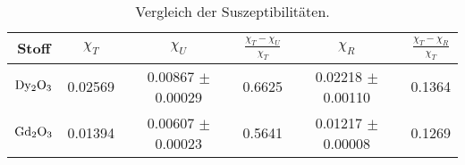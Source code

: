 \begin{table}
  \centering
  \label{tab:vergleich}
  \begin{tabular}{c c c c c c}
    \toprule
    {Stoff} & {$\chi_T$} &{$\chi_U$} & {$\frac{\chi_T - \chi_U}{\chi_T}$} & {$\chi_R$} & {$\frac{\chi_T - \chi_R}{\chi_T}$}\\
    \midrule
    $\ce{Dy2O3}$ & 0.02569 & 0.00867 $\pm$ 0.00029 & 0.6625 & 0.02218 $\pm$ 0.00110 & 0.1364 \\
    $\ce{Gd2O3}$ & 0.01394 & 0.00607 $\pm$ 0.00023 & 0.5641 & 0.01217 $\pm$ 0.00008 & 0.1269 \\
    \bottomrule
  \end{tabular}
  \caption{Vergleich der Suszeptibilitäten.}
\end{table}